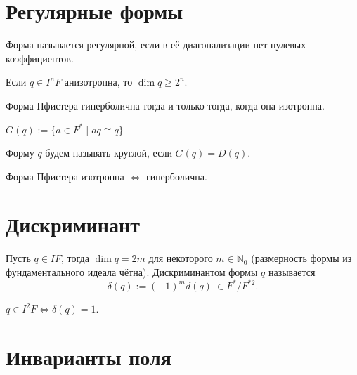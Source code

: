 \documentclass[12pt]{article}
\begin{document}
	\section{Регулярные формы}
	
	\begin{definition}
		Форма называется регулярной, если в её диагонализации нет нулевых коэффициентов.
	\end{definition}
	
	\begin{theorem}
		Если $q \in I^n F$ анизотропна, то $\dim q \geqslant 2^n$.
	\end{theorem}
	
	\begin{theorem}
		Форма Пфистера гиперболична тогда и только тогда, когда она изотропна.
	\end{theorem}
	
	\begin{definition}
		$G(q) := \{ a \in F^* \mid aq \cong q \}$
	\end{definition}
	
	\begin{definition}
		Форму $q$ будем называть круглой, если $G(q) = D(q)$.
	\end{definition}
	
	\begin{theorem}
		Форма Пфистера изотропна $\Leftrightarrow$ гиперболична.
	\end{theorem}
	
	\section{Дискриминант}
	
	\begin{definition}[Дискриминант]
		Пусть $q \in IF$, тогда $\dim q = 2m$ для некоторого $m \in \mathbb{N}_0$ (размерность формы из фундаментального идеала чётна). Дискриминантом формы $q$ называется
		\[
		\delta(q) := (-1)^m d(q) \ \in F^* / F^{*2}.
		\]
	\end{definition}
	
	\begin{theorem}
		$q \in I^2 F \Leftrightarrow \delta(q) = 1$.
	\end{theorem}
	
	\section{Инварианты поля}
	
\end{document}
